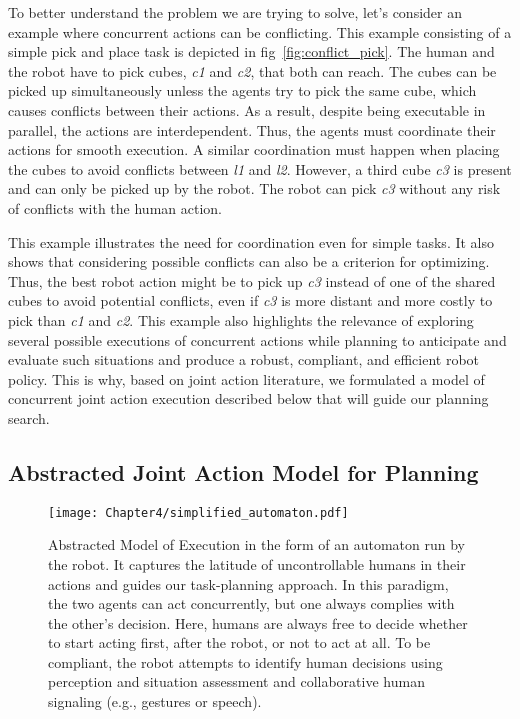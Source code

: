 To better understand the problem we are trying to solve, let's consider an example where concurrent actions can be conflicting. This example consisting of a simple pick and place task is depicted in fig~\ref{fig:conflict_pick}. The human and the robot have to pick cubes, \emph{c1} and \emph{c2}, that both can reach. 
The cubes can be picked up simultaneously unless the agents try to pick the same cube, which causes conflicts between their actions. As a result, despite being executable in parallel, the actions are interdependent. Thus, the agents must coordinate their actions for smooth execution.
A similar coordination must happen when placing the cubes to avoid conflicts between \emph{l1} and \emph{l2}.
However, a third cube \emph{c3} is present and can only be picked up by the robot. The robot can pick \emph{c3} without any risk of conflicts with the human action. 

This example illustrates the need for coordination even for simple tasks. It also shows that considering possible conflicts can also be a criterion for optimizing. Thus, the best robot action might be to pick up \emph{c3} instead of one of the shared cubes to avoid potential conflicts, even if \emph{c3} is more distant and more costly to pick than \emph{c1} and \emph{c2}.
This example also highlights the relevance of exploring several possible executions of concurrent actions while planning to anticipate and evaluate such situations and produce a robust, compliant, and efficient robot policy. This is why, based on joint action literature, we formulated a model of concurrent joint action execution described below that will guide our planning search.

\subsection{Abstracted Joint Action Model for Planning}

\begin{figure}
    \centering
    \texttt{[image: Chapter4/simplified\_automaton.pdf]}
    \caption{
    Abstracted Model of Execution in the form of an automaton run by the robot. It captures the latitude of uncontrollable humans in their actions and guides our task-planning approach.
    In this paradigm, the two agents can act concurrently, but one always complies with the other's decision.
    Here, humans are always free to decide whether to start acting first, after the robot, or not to act at all.
    To be compliant, the robot attempts to identify human decisions using perception and situation assessment and collaborative human signaling (e.g., gestures or speech).
    }
    \label{fig:simplified_model_exec}
\end{figure}

